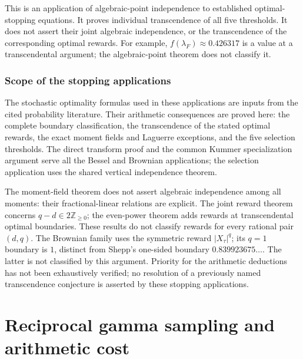 \documentclass[11pt,a4paper]{article}
\theoremstyle{definition}
\theoremstyle{remark}
\numberwithin{equation}{section}
\begin{document}
This is an application of algebraic-point independence to established
optimal-stopping equations. It proves individual transcendence of all
five thresholds. It does not assert their joint algebraic independence,
or the transcendence of the corresponding optimal rewards. For example,
$f(\lambda_F)\approx0.426317$ is a value at a transcendental argument;
the algebraic-point theorem does not classify it.



\section{Scope of the stopping applications}
The stochastic optimality formulas used in these applications are
inputs from the cited probability literature. Their arithmetic
consequences are proved here: the complete boundary classification,
the transcendence of the stated optimal rewards, the exact moment
fields and Laguerre exceptions, and the five selection thresholds.
The direct transform proof and the common Kummer specialization
argument serve all the Bessel and Brownian applications; the
selection application uses the shared vertical independence theorem.

The moment-field theorem does not assert algebraic independence
among all moments: their fractional-linear relations are explicit.
The joint reward theorem concerns $q-d\in2\mathbb Z_{\geq0}$; the
even-power theorem adds rewards at transcendental optimal boundaries.
These results do not classify rewards for every rational pair $(d,q)$.
The Brownian family uses the symmetric reward $|X_\tau|^q$; its
$q=1$ boundary is $1$, distinct from Shepp's one-sided boundary
$0.839923675\ldots$. The latter is not classified by this argument.
Priority for the arithmetic deductions has not been exhaustively
verified; no resolution of a previously named transcendence
conjecture is asserted by these stopping applications.


\clearpage
\part{Reciprocal gamma sampling and arithmetic cost}\label{part:sampling}
\end{document}
